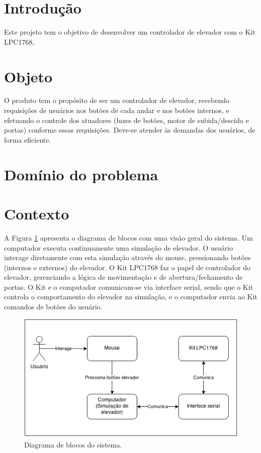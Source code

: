 
\section{Introdução}

Este projeto tem o objetivo de desenvolver um controlador de elevador com o Kit LPC1768, 

\section{Objeto}
O produto tem o propósito de ser um controlador de elevador, recebendo requisições de usuários nos botões de cada andar e nos botões internos, e efetuando o controle dos atuadores (luzes de botões, motor de subida/descida e portas) conforme essas requisições. Deve-se atender às demandas dos usuários, de forma eficiente.

\section{Domínio do problema}

\section{Contexto}

A Figura \ref{fig:diagrama_blocos} apresenta o diagrama de blocos com uma visão geral do sistema. Um computador executa continuamente uma simulação de elevador. O usuário interage diretamente com esta simulação através do mouse, pressionando botões (internos e externos) do elevador. O Kit LPC1768 faz o papel de controlador do elevador, gerenciando a lógica de movimentação e de abertura/fechamento de portas. O Kit e o computador comunicam-se via interface serial, sendo que o Kit controla o comportamento do elevador na simulação, e o computador envia ao Kit comandos de botões do usuário. 

\begin{figure}[h]
\begin{center}
    \includegraphics[width=0.8\columnwidth]{./figures/diagrama_blocos.png}
    \caption{Diagrama de blocos do sistema.}
    \label{fig:diagrama_blocos}
\end{center}
\end{figure}


